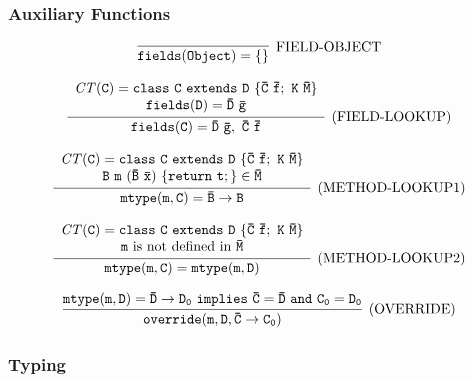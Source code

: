 \documentclass[letterpaper]{article}
\begin{document}
\subsubsection{Auxiliary Functions}
\[
  \begin{array}{c}
    \infer[\text{FIELD-OBJECT}]
    {\tt fields(Object)=\{\}}
    {}
  \end{array}
\]

\[
  \begin{array}{c}
    \infer[\text{(FIELD-LOOKUP)}]
    {\tt fields(C)=\bar{D}\ \bar{g},~ \bar{C}\ \bar{f}}
    {\begin{array}{c}
      \tt \mathit{CT}(C)=class\ C\ extends\ D\ \{\bar{C}\ \bar{f};\ K\ \bar{M}\} \\
      \tt fields(D)=\bar{D}\ \bar{g}
      \end{array}
    }
  \end{array}
\]

\[
  \begin{array}{c}
    \infer[\text{(METHOD-LOOKUP1)}]
    {\tt mtype(m,C)=\bar{B}\rightarrow B}
    {
      \begin{array}{c}
        \tt \mathit{CT}(C)=class\ C\ extends\ D\ \{\bar{C}\ \bar{f};\ K\ \bar{M}\}\\
        \tt B\ m\ (\bar{B}\ \bar{x})\ \{return\ t;\} \in \bar{M}
      \end{array}
    }
  \end{array}
\]

\[
  \begin{array}{c}
    \infer[\text{(METHOD-LOOKUP2)}]
    {\tt mtype(m,C)=mtype(m,D)}
    {
      \begin{array}{c}
        \tt \mathit{CT}(C)=class\ C\ extends\ D\ \{\bar{C}\ \bar{f};\ K\ \bar{M}\}\\
        \text{$\tt m$ is not defined in $\tt\bar{M}$}
      \end{array}
    }
  \end{array}
\]

\[
  \begin{array}{c}
    \infer[\text{(OVERRIDE)}]
    {\tt override(m,D,\bar{C}\rightarrow C_0)}
    {\tt mtype(m,D)=\bar{D}\rightarrow D_0\ implies\ \bar{C}=\bar{D}\ and\ C_0=D_0}
  \end{array}
\]
\subsubsection{Typing}
\begin{center}
\DP
\end{center}
\vspace{3pt}
\end{document}
